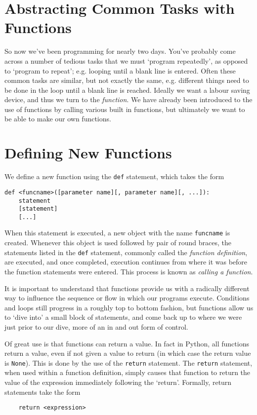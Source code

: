 \section{Abstracting Common Tasks with Functions}

So now we've been programming for nearly two days. You've probably come   across a number of tedious tasks that we must `program repeatedly', as   opposed to `program to repeat'; e.g. looping until a blank line is   entered. Often these common tasks are similar, but not exactly the   same, e.g. different things need to be done in the loop until a blank   line is reached. Ideally we want a labour saving device, and thus we   turn to the \textit{function}. We have   already been introduced to the use of functions by calling various   built in functions, but ultimately we want to be able to make our own   functions.

\section{Defining New Functions}

We define a new function using the \texttt{def} statement,   which takes the form
\begin{lstlisting}
def <funcname>([parameter name][, parameter name][, ...]):
    statement
    [statement]
    [...]
\end{lstlisting}

When this statement is executed, a new object with the name   \texttt{funcname} is created. Whenever this object is used followed by pair of   round braces, the statements listed in the \texttt{def} statement, commonly   called the \textit{function definition}, are executed, and once   completed, execution continues from where it was before the function   statements were entered. This process is known as \textit{calling a   function}.

It is important to understand that functions provide us with a   radically different way to influence the sequence or flow in which our   programs execute. Conditions and loops still progress in a roughly top   to bottom fashion, but functions allow us to `dive into' a small block   of statements, and come back up to where we were just prior to our   dive, more of an in and out form of control.

Of great use is that functions can return a value. In fact in   Python, all functions return a value, even if not given a value to   return (in which case the return value is \texttt{None}). This is done by the   use of the \texttt{return} statement. The \texttt{return} statement,   when used within a function definition, simply causes that function to   return the value of the expression immediately following the `return'.   Formally, return statements take the form
\begin{lstlisting}
    return <expression>
\end{lstlisting}

